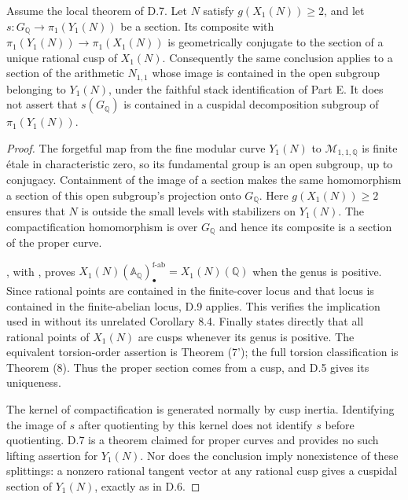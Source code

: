 Assume the local theorem of D.7.  Let $N$ satisfy $g(X_1(N))\geq2$, and let
$s:G_{\mathbb Q}\to\pi_1(Y_1(N))$ be a section.  Its composite with
$\pi_1(Y_1(N))\to\pi_1(X_1(N))$ is geometrically conjugate to the section of
a unique rational cusp of $X_1(N)$.  Consequently the same conclusion applies
to a section of the arithmetic $N_{1,1}$ whose image is contained in the
open subgroup belonging to $Y_1(N)$, under the faithful stack identification
of Part E.  It does not assert that $s(G_{\mathbb Q})$ is contained in a
cuspidal decomposition subgroup of $\pi_1(Y_1(N))$.
\begin{proof}
The forgetful map from the fine modular curve $Y_1(N)$ to
$\mathcal M_{1,1,\mathbb Q}$ is finite \'etale in characteristic zero, so its
fundamental group is an open subgroup, up to conjugacy.  Containment of the
image of a section makes the same homomorphism a section of this open
subgroup's projection onto $G_{\mathbb Q}$.  Here $g(X_1(N))\geq2$ ensures
that $N$ is outside the small levels with stabilizers on $Y_1(N)$.
The compactification homomorphism is over $G_{\mathbb Q}$ and hence its
composite is a section of the proper curve.

\citet[Corollary 8.8]{Stoll2007}, with \citet{Stoll2017Errata}, proves
$X_1(N)(\mathbb A_{\mathbb Q})_\bullet^{\mathrm{f\text{-}ab}}=X_1(N)(\mathbb Q)$
when the genus is positive.  Since rational points are contained in the
finite-cover locus and that locus is contained in the finite-abelian locus,
D.9 applies.  This verifies the implication used in
\citet[Corollary 8.5]{OpenAI019} without its unrelated Corollary 8.4.
Finally \citet[Introduction, Theorem (7), p.~35]{Mazur1977} states directly
that all rational points of $X_1(N)$ are cusps whenever its genus is positive.
The equivalent torsion-order assertion is Theorem (7'); the full torsion
classification is Theorem (8).  Thus the proper section comes from a cusp,
and D.5 gives its uniqueness.

The kernel of compactification is generated normally by cusp inertia.
Identifying the image of $s$ after quotienting by this kernel does not identify
$s$ before quotienting.  D.7 is a theorem claimed for proper curves and
provides no such lifting assertion for $Y_1(N)$.  Nor does the conclusion
imply nonexistence of these splittings: a nonzero rational tangent vector at
any rational cusp gives a cuspidal section of $Y_1(N)$, exactly as in D.6.
\end{proof}

